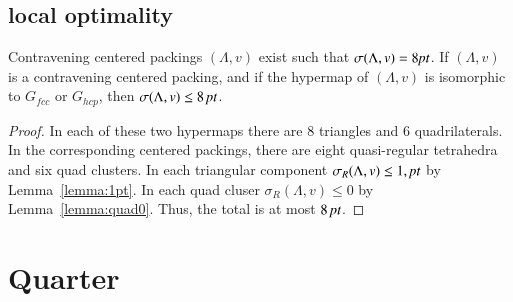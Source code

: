 \subsection{local optimality}%
\label{sec:local-opt}

\begin{lemma}  %
Contravening centered packings $(\Lambda,v)$ exist such that
$\sigma(\Lambda,v)=8\hbox{\it pt}$. If $(\Lambda,v)$ is a contravening centered packing, and
if the hypermap of $(\Lambda,v)$ is isomorphic to $G_{fcc}$ or $G_{hcp}$,
then $\sigma(\Lambda,v) \le 8\,\hbox{\it pt}$.
\end{lemma} %

\begin{proof}
In each of these two hypermaps there are $8$ triangles and
$6$ quadrilaterals.  In the corresponding centered packings,
there are  eight quasi-regular tetrahedra and six quad clusters.
In each triangular component $\sigma_R(\Lambda,v)\le 1,\hbox{\it pt}$ by Lemma~\ref{lemma:1pt}.
In each quad cluser $\sigma_R(\Lambda,v)\le 0$ by Lemma~\ref{lemma:quad0}.  
Thus, the total is
at most $8\,\hbox{\it pt}$.
\end{proof}













\section{Quarter} %
    \label{sec:upright}









